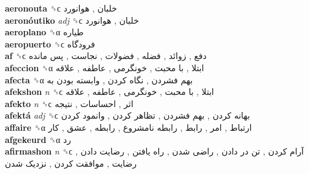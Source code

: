 \textbf{aeronouta} ␝ϲ   خلبان ,  هوانورد   \\
\textbf{aeronóutiko} \emph{adj}  ␝ϲ   خلبان ,  هوانورد   \\
\textbf{aeroplano} ␝α   طیاره   \\
\textbf{aeropuerto} ␝ϲ   فرودگاه   \\
\textbf{af} ␝ϲ   دفع ,  زوائد ,  فضله ,  فضولات ,  نجاست ,  پس مانده   \\
\textbf{afeccion} ␝α   ابتلا ,  با محبت ,  خونگرمی ,  عاطفه ,  علاقه   \\
\textbf{afecta} ␝α   بهم فشردن ,  نگاه کردن ,  وابسته بودن به   \\
\textbf{afekshon} \emph{n}  ␝ϲ   ابتلا ,  با محبت ,  خونگرمی ,  عاطفه ,  علاقه   \\
\textbf{afekto} \emph{n}  ␝ϲ   اثر ,  احساسات ,  نتیجه   \\
\textbf{afektá} \emph{adj}  ␝ϲ   بهانه کردن ,  بهم فشردن ,  تظاهر کردن ,  وانمود کردن   \\
\textbf{affaire} ␝α   ارتباط ,  امر ,  رابط ,  رابطه نامشروع ,  رابطه ,  عشق ,  کار   \\
\textbf{afgekeurd} ␝α   رد   \\
\textbf{afirmashon} \emph{n}  ␝ϲ   آرام کردن ,  تن در دادن ,  راضی شدن ,  راه یافتن ,  رضایت دادن ,  رضایت ,  موافقت کردن ,  نزدیک شدن   \\
